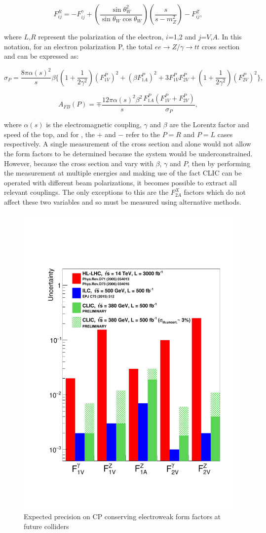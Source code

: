 \begin{equation}
F_{ij}^{R} = -F_{ij}^{\gamma} +(\frac{\sin\theta_W^2}{\sin\theta_W\cos\theta_W})(\frac{s}{s-m_Z^2}) -F_{ij}^{Z},
\end{equation}

where $L$,$R$ represent the polarization of the electron, $i$=1,2 and $j$=$V$,$A$. In this notation, for an electron polarization P, the total $ee\rightarrow Z/\gamma\rightarrow tt$ cross section and \afb can be expressed as:

\begin{equation}
\sigma_P = \frac{8\pi\alpha(s)^2}{s}\beta \{(1 + \frac{1}{2\gamma^2})(F_{1V}^P)^2 +(\beta F_{1A}^P)^2 +3F_{1V}^P F_{2V}^P + (1 + \frac{1}{2\gamma^2})(F_{2V}^P)^2\},
\end{equation}

\begin{equation}
\label{eq:afbFormFactors}
A_{FB}(P) = \mp \frac{12\pi\alpha(s)^2 \beta^2}{s}\frac{F_{1A}^P(F_{1V}^P +F_{2V}^P)}{\sigma_P},
\end{equation}

where $\alpha(s)$  is the electromagnetic coupling, $\gamma$ and $\beta$ are the Lorentz factor and speed of the top, and for , the $+$ and $-$ refer to the $P=R$ and $P=L$ cases respectively. A single measurement of the cross section and \afb alone would not allow the form factors to be determined because the system would be underconstrained. However, because the cross section and \afb vary with $\beta$, $\gamma$ and $P$, then by performing the measurement at multiple energies and making use of the fact \ac{CLIC} can be operated with different beam polarizations, it becomes possible to extract all relevant couplings. The only exceptions to this are the $F_{2A}^X$ factors which do not affect these two variables and so must be measured using alternative methods. 

\begin{figure}
\centering
\includegraphics[width=0.45\linewidth]{Theory/fig/FormFactorsTopCLIC380.pdf}
\caption[Expected precision on CP conserving electroweak form factors at future colliders]{Expected precision on CP conserving electroweak form factors at future colliders \cite{CLIC:2016zwp}}
\label{fig:CPConserving}
\end{figure}

